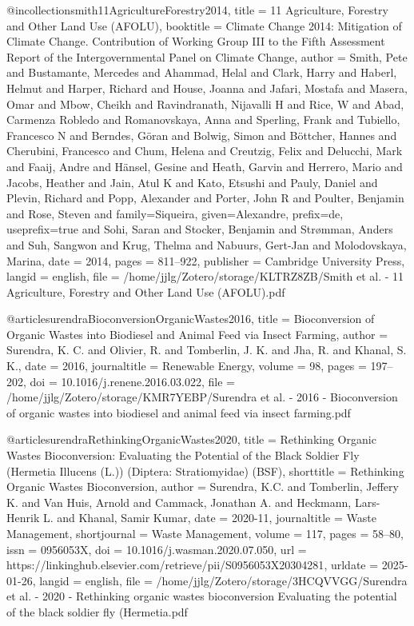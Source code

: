 {{{{@incollection{smith11AgricultureForestry2014,
  title = {11 {{Agriculture}}, {{Forestry}} and {{Other Land Use}} ({{AFOLU}})},
  booktitle = {Climate Change 2014: {{Mitigation}} of Climate Change. {{Contribution}} of Working Group {{III}} to the Fifth Assessment Report of the Intergovernmental Panel on Climate Change},
  author = {Smith, Pete and Bustamante, Mercedes and Ahammad, Helal and Clark, Harry and Haberl, Helmut and Harper, Richard and House, Joanna and Jafari, Mostafa and Masera, Omar and Mbow, Cheikh and Ravindranath, Nijavalli H and Rice, W and Abad, Carmenza Robledo and Romanovskaya, Anna and Sperling, Frank and Tubiello, Francesco N and Berndes, Göran and Bolwig, Simon and Böttcher, Hannes and Cherubini, Francesco and Chum, Helena and Creutzig, Felix and Delucchi, Mark and Faaij, Andre and Hänsel, Gesine and Heath, Garvin and Herrero, Mario and Jacobs, Heather and Jain, Atul K and Kato, Etsushi and Pauly, Daniel and Plevin, Richard and Popp, Alexander and Porter, John R and Poulter, Benjamin and Rose, Steven and family=Siqueira, given=Alexandre, prefix=de, useprefix=true and Sohi, Saran and Stocker, Benjamin and Strømman, Anders and Suh, Sangwon and Krug, Thelma and Nabuurs, Gert-Jan and Molodovskaya, Marina},
  date = {2014},
  pages = {811--922},
  publisher = {Cambridge University Press},
  langid = {english},
  file = {/home/jjlg/Zotero/storage/KLTRZ8ZB/Smith et al. - 11 Agriculture, Forestry and Other Land Use (AFOLU).pdf}
}

@article{surendraBioconversionOrganicWastes2016,
  title = {Bioconversion of Organic Wastes into Biodiesel and Animal Feed via Insect Farming},
  author = {Surendra, K. C. and Olivier, R. and Tomberlin, J. K. and Jha, R. and Khanal, S. K.},
  date = {2016},
  journaltitle = {Renewable Energy},
  volume = {98},
  pages = {197--202},
  doi = {10.1016/j.renene.2016.03.022},
  file = {/home/jjlg/Zotero/storage/KMR7YEBP/Surendra et al. - 2016 - Bioconversion of organic wastes into biodiesel and animal feed via insect farming.pdf}
}

@article{surendraRethinkingOrganicWastes2020,
  title = {Rethinking Organic Wastes Bioconversion: {{Evaluating}} the Potential of the Black Soldier Fly ({{Hermetia}} Illucens ({{L}}.)) ({{Diptera}}: {{Stratiomyidae}}) ({{BSF}})},
  shorttitle = {Rethinking Organic Wastes Bioconversion},
  author = {Surendra, K.C. and Tomberlin, Jeffery K. and Van Huis, Arnold and Cammack, Jonathan A. and Heckmann, Lars-Henrik L. and Khanal, Samir Kumar},
  date = {2020-11},
  journaltitle = {Waste Management},
  shortjournal = {Waste Management},
  volume = {117},
  pages = {58--80},
  issn = {0956053X},
  doi = {10.1016/j.wasman.2020.07.050},
  url = {https://linkinghub.elsevier.com/retrieve/pii/S0956053X20304281},
  urldate = {2025-01-26},
  langid = {english},
  file = {/home/jjlg/Zotero/storage/3HCQVVGG/Surendra et al. - 2020 - Rethinking organic wastes bioconversion Evaluating the potential of the black soldier fly (Hermetia.pdf}
}

}}}}
